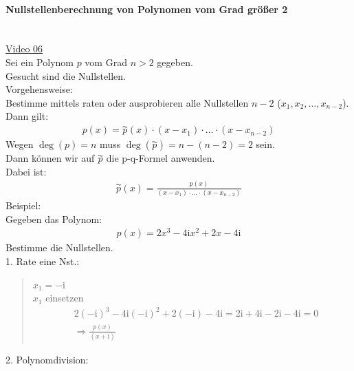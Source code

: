 \paragraph{Nullstellenberechnung von Polynomen vom Grad größer 2}$  $\vspace*{3mm}\\
\href{https://youtu.be/Phr9F9GFmws}{Video 06}\\
Sei ein Polynom $ p $  vom Grad $ n>2 $ gegeben.\\Gesucht sind die Nullstellen.\vspace*{2mm}\\
Vorgehensweise:\\
Bestimme mittels raten oder ausprobieren alle Nullstellen $ n-2 $ ($x_1, x_2,\ldots,x_{n-2}$).\\
Dann gilt:\\
\begin{align*}
p(x)=\overset{\AC}{p}(x)\cdot (x-x_1)\cdot\ldots\cdot(x-x_{n-2})
\end{align*}
Wegen $ \deg(p)=n $ muss $ \deg(\overset{\AC}{p})=n-(n-2)=2 $ sein.\\
Dann können wir auf $\overset{\AC}{p}  $ die p-q-Formel anwenden.\\
Dabei ist:\\
\begin{align*}
\overset{\AC}{p}(x)=\frac{p(x)}{(x-x_1)\cdot\ldots\cdot(x-x_{n-2})}
\end{align*}
Beispiel:\\
Gegeben das Polynom:   \\
\begin{align*}
p(x)=2x^3-4\mathrm{i}x^2+2x-4\mathrm{i}
\end{align*}
Bestimme die Nullstellen.\\
1. Rate eine Nst.:
\begin{quote}
	$x_1=-\mathrm{i}$\\
	$ x_1$ einsetzen \\
	\begin{align*}
	&2(-\mathrm{i})^3-4\mathrm{i}(-\mathrm{i})^2+2(-\mathrm{i})-4\mathrm{i}=2\mathrm{i}+4\mathrm{i}-2\mathrm{i}-4\mathrm{i}=0\\
	&\Rightarrow \frac{p(x)}{(x+\mathrm{i})}
	\end{align*}
\end{quote}
2. Polynomdivision:\\
